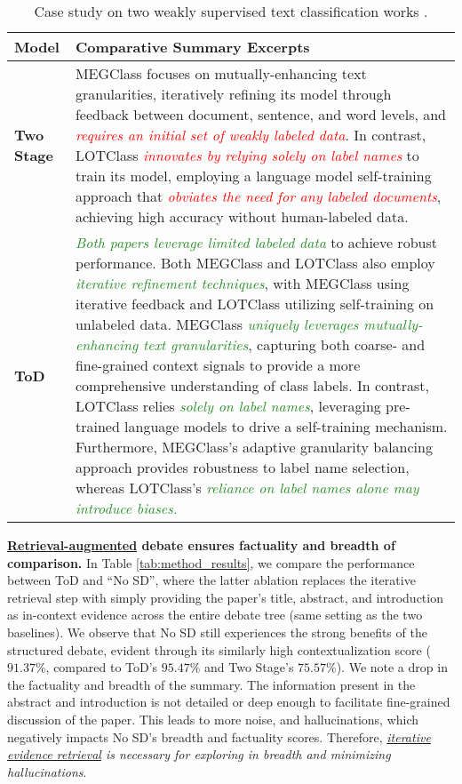 \begin{table*}[h!]
    \centering
    \small
    \renewcommand{\arraystretch}{1.1}
    \begin{tabular}{|p{0.75cm}|p{14.5cm}|}
        \hline
        \textbf{Model} & \textbf{Comparative Summary Excerpts} \\ 
        \hline
        \textbf{Two Stage} & MEGClass focuses on mutually-enhancing text granularities, iteratively refining its model through feedback between document, sentence, and word levels, and \textit{\textcolor{red}{requires an initial set of weakly labeled data}}. In contrast, LOTClass \textit{\textcolor{red}{innovates by relying solely on label names}} to train its model, employing a language model self-training approach that \textit{\textcolor{red}{obviates the need for any labeled documents}}, achieving high accuracy without human-labeled data. \\ 
        \hline
        \textbf{ToD} & \textit{\textcolor{ForestGreen}{Both papers leverage limited labeled data}} to achieve robust performance. Both MEGClass and LOTClass also employ \textit{\textcolor{ForestGreen}{iterative refinement techniques}}, with MEGClass using iterative feedback and LOTClass utilizing self-training on unlabeled data. MEGClass \textit{\textcolor{ForestGreen}{uniquely leverages mutually-enhancing text granularities}}, capturing both coarse- and fine-grained context signals to provide a more comprehensive understanding of class labels. In contrast, LOTClass relies \textit{\textcolor{ForestGreen}{solely on label names}}, leveraging pre-trained language models to drive a self-training mechanism. Furthermore, MEGClass's adaptive granularity balancing approach provides robustness to label name selection, whereas LOTClass's \textit{\textcolor{ForestGreen}{reliance on label names alone may introduce biases.}} \\ 
        \hline
    \end{tabular}
    \caption{Case study on two weakly supervised text classification works \cite{kargupta-etal-2023-megclass,meng-etal-2020-text}.}
    \label{tab:summary}
\end{table*}

\par{\textbf{\underline{Retrieval-augmented} debate ensures factuality and breadth of comparison.}} In Table \ref{tab:method_results}, we compare the performance between ToD and ``No SD'', where the latter ablation replaces the iterative retrieval step with simply providing the paper's title, abstract, and introduction as in-context evidence across the entire debate tree (same setting as the two baselines). We observe that No SD still experiences the strong benefits of the structured debate, evident through its similarly high contextualization score ($91.37\%$, compared to ToD's $95.47\%$ and Two Stage's $75.57\%$). We note a drop in the factuality and breadth of the summary. The information present in the abstract and introduction is not detailed or deep enough to facilitate fine-grained discussion of the paper. This leads to more noise, and hallucinations, which negatively impacts No SD's breadth and factuality scores. Therefore, \textit{\underline{iterative evidence retrieval} is necessary for exploring in breadth and minimizing hallucinations}.


